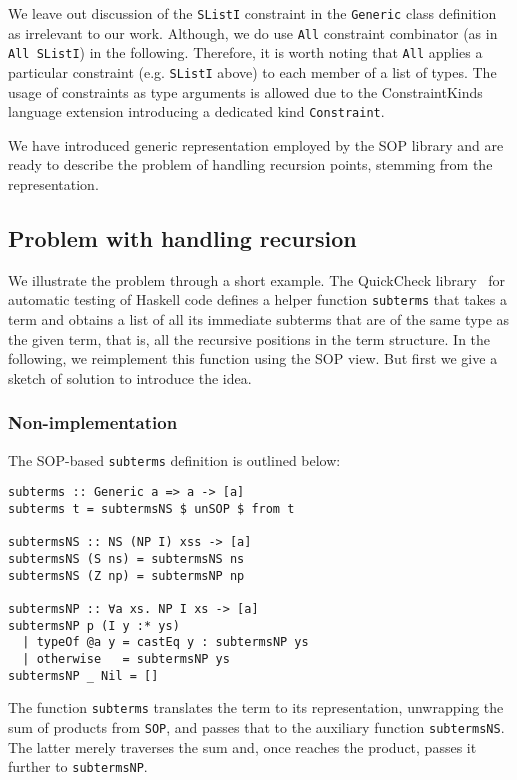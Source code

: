 \documentclass[runningheads]{llncs}
\newcommand{\K}[1]{\lstinline{#1}}
\begin{document}
We leave out discussion of the \K{SListI} constraint in the \K{Generic} class definition as irrelevant to our work. Although, we do use \K{All} constraint combinator (as in \K{All SListI}) in the following. Therefore, it is worth noting that \K{All} applies a particular constraint (e.g. \K{SListI} above) to each member of a list of types. The usage of constraints as type arguments is allowed due to the \textsf{ConstraintKinds} language extension introducing a dedicated kind \K{Constraint}.

We have introduced generic representation employed by the SOP library and are ready to describe the problem of handling recursion points, stemming from the representation. 

\subsection{Problem with handling recursion}
\label{sec:recursion-problem}

We illustrate the problem through a short example. The \textsf{QuickCheck} library~\cite{Claessen2011} for automatic testing of Haskell code defines a helper function \K{subterms} that takes a term and obtains a list of all its immediate subterms that are of the same type as the given term, that is, all the recursive positions in the term structure. In the following, we reimplement this function using the SOP view. But first we give a sketch of solution to introduce the idea.

\subsubsection{Non-implementation}

The SOP-based \K{subterms} definition is outlined below:
\begin{lstlisting}
subterms :: Generic a => a -> [a]
subterms t = subtermsNS $ unSOP $ from t

subtermsNS :: NS (NP I) xss -> [a]
subtermsNS (S ns) = subtermsNS ns
subtermsNS (Z np) = subtermsNP np

subtermsNP :: ∀a xs. NP I xs -> [a]
subtermsNP p (I y :* ys)
  | typeOf @a y = castEq y : subtermsNP ys
  | otherwise   = subtermsNP ys
subtermsNP _ Nil = []
\end{lstlisting}
The function \K{subterms} translates the term to its representation, unwrapping the sum of products from \K{SOP}, and passes that to the auxiliary function \K{subtermsNS}. The latter merely traverses the sum and, once reaches the product,  passes it further to \K{subtermsNP}.
\end{document}
